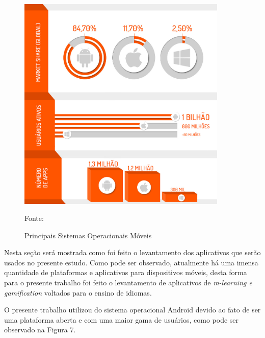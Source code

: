 \documentclass[
	12pt,				%
	openany,			%
	oneside,			%
	a4paper,			%
	english,			%
	french,				%
	spanish,			%
	brazil				%
	]{abntex2}
\begin{document}
\begin{figure}[H]
    \centering
\caption{Principais Sistemas Operacionais Móveis}
\includegraphics[width=10cm]{figuras/so.png}
\par
 Fonte: \cite{IDC}
\end{figure}

Nesta seção será mostrada como foi feito o levantamento dos aplicativos que serão usados no presente estudo.
Como pode ser observado, atualmente há uma imensa quantidade de  plataformas e aplicativos para dispositivos móveis, desta forma para o presente trabalho foi feito o levantamento de aplicativos de \textit{m-learning e gamification} voltados para o ensino de idiomas.

O presente trabalho utilizou do sistema operacional Android devido ao fato de ser uma plataforma aberta e com uma maior gama de usuários, como pode ser observado na Figura 7.
 
\end{document}
